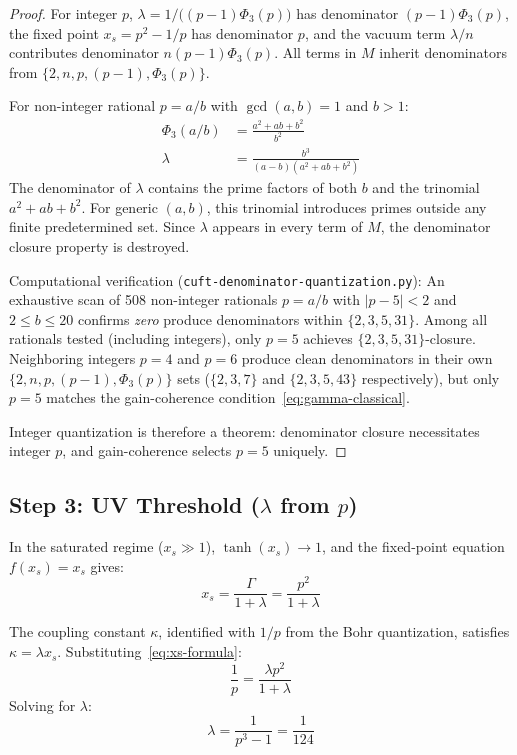\documentclass[12pt,a4paper]{article}
\theoremstyle{definition}
\newcommand{\Phithree}{\Phi_3}
\begin{document}
\begin{proof}
For integer $p$, $\lambda = 1/\bigl((p-1)\Phithree(p)\bigr)$ has denominator
$(p-1)\Phithree(p)$, the fixed point $x_s = p^2 - 1/p$ has denominator $p$,
and the vacuum term $\lambda/n$ contributes denominator $n(p-1)\Phithree(p)$.
All terms in $M$ inherit denominators from $\{2, n, p, (p-1), \Phithree(p)\}$.

For non-integer rational $p = a/b$ with $\gcd(a,b) = 1$ and $b > 1$:
\begin{align}
  \Phithree(a/b) &= \frac{a^2 + ab + b^2}{b^2} \label{eq:phi3-nonint} \\
  \lambda &= \frac{b^3}{(a-b)(a^2 + ab + b^2)} \label{eq:lambda-nonint}
\end{align}
The denominator of $\lambda$ contains the prime factors of both $b$ and the
trinomial $a^2 + ab + b^2$. For generic $(a, b)$, this trinomial introduces
primes outside any finite predetermined set. Since $\lambda$ appears in
every term of $M$, the denominator closure property is destroyed.

Computational verification (\texttt{cuft-denominator-quantization.py}): An exhaustive
scan of 508 non-integer rationals $p = a/b$ with $|p - 5| < 2$ and
$2 \le b \le 20$ confirms \emph{zero} produce denominators within
$\{2, 3, 5, 31\}$. Among all rationals tested (including integers), only
$p = 5$ achieves $\{2, 3, 5, 31\}$-closure. Neighboring integers $p = 4$
and $p = 6$ produce clean denominators in their own
$\{2, n, p, (p-1), \Phithree(p)\}$ sets ($\{2,3,7\}$ and $\{2,3,5,43\}$
respectively), but only $p = 5$ matches the gain-coherence
condition~\eqref{eq:gamma-classical}.

Integer quantization is therefore a theorem: denominator closure
necessitates integer $p$, and gain-coherence selects $p = 5$ uniquely.
\end{proof}

\subsection*{Step 3: UV Threshold ($\lambda$ from $p$)}

In the saturated regime ($x_s \gg 1$), $\tanh(x_s) \to 1$, and the
fixed-point equation $f(x_s) = x_s$ gives:
\begin{equation}\label{eq:xs-formula}
  x_s = \frac{\Gamma}{1 + \lambda} = \frac{p^2}{1 + \lambda}
\end{equation}

The coupling constant $\kappa$, identified with $1/p$ from the Bohr
quantization, satisfies $\kappa = \lambda x_s$. Substituting~\eqref{eq:xs-formula}:
\[
  \frac{1}{p} = \frac{\lambda p^2}{1 + \lambda}
\]
Solving for $\lambda$:
\begin{equation}\label{eq:lambda}
  \lambda = \frac{1}{p^3 - 1} = \frac{1}{124}
\end{equation}
\end{document}
